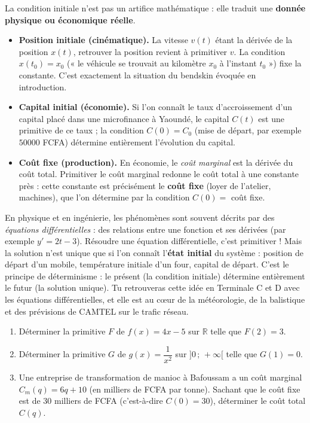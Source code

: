 \documentclass[11pt]{article}
\newcounter{popsec}
\newcounter{popsub}
\newcommand{\courssub}[1]{%
  \stepcounter{popsub}%
  \par\vspace{9pt}\noindent{\popxbold\fontsize{11.5}{13}\selectfont\color{popink}{\color{poporange}\thepopsec.\thepopsub}\hspace{6pt}#1}\par\nopagebreak\vspace{4pt}
}
\begin{document}
\courssub{Lien avec les situations concrètes}

La condition initiale n'est pas un artifice mathématique : elle traduit une \textbf{donnée physique ou économique réelle}.

\begin{itemize}
\item \textbf{Position initiale (cinématique).} La vitesse $v(t)$ étant la dérivée de la position $x(t)$, retrouver la position revient à primitiver $v$. La condition $x(t_0) = x_0$ (« le véhicule se trouvait au kilomètre $x_0$ à l'instant $t_0$ ») fixe la constante. C'est exactement la situation du bendskin évoquée en introduction.
\item \textbf{Capital initial (économie).} Si l'on connaît le taux d'accroissement d'un capital placé dans une microfinance à Yaoundé, le capital $C(t)$ est une primitive de ce taux ; la condition $C(0) = C_0$ (mise de départ, par exemple $\num{50000}$ FCFA) détermine entièrement l'évolution du capital.
\item \textbf{Coût fixe (production).} En économie, le \emph{coût marginal} est la dérivée du coût total. Primitiver le coût marginal redonne le coût total à une constante près : cette constante est précisément le \textbf{coût fixe} (loyer de l'atelier, machines), que l'on détermine par la condition $C(0) = $ coût fixe.
\end{itemize}

\begin{savaistu}
En physique et en ingénierie, les phénomènes sont souvent décrits par des \emph{équations différentielles} : des relations entre une fonction et ses dérivées (par exemple $y' = 2t - 3$). Résoudre une équation différentielle, c'est primitiver ! Mais la solution n'est unique que si l'on connaît l'\textbf{état initial} du système : position de départ d'un mobile, température initiale d'un four, capital de départ. C'est le principe de déterminisme : le présent (la condition initiale) détermine entièrement le futur (la solution unique). Tu retrouveras cette idée en Terminale C et D avec les équations différentielles, et elle est au cœur de la météorologie, de la balistique et des prévisions de CAMTEL sur le trafic réseau.
\end{savaistu}

\begin{exercice}
\begin{enumerate}
\item Déterminer la primitive $F$ de $f(x) = 4x - 5$ sur $\mathbb{R}$ telle que $F(2) = 3$.
\item Déterminer la primitive $G$ de $g(x) = \dfrac{1}{x^2}$ sur $]0\,;\,+\infty[$ telle que $G(1) = 0$.
\item Une entreprise de transformation de manioc à Bafoussam a un coût marginal $C_m(q) = 6q + 10$ (en milliers de FCFA par tonne). Sachant que le coût fixe est de $30$ milliers de FCFA (c'est-à-dire $C(0) = 30$), déterminer le coût total $C(q)$.
\end{enumerate}
\end{exercice}
\end{document}
